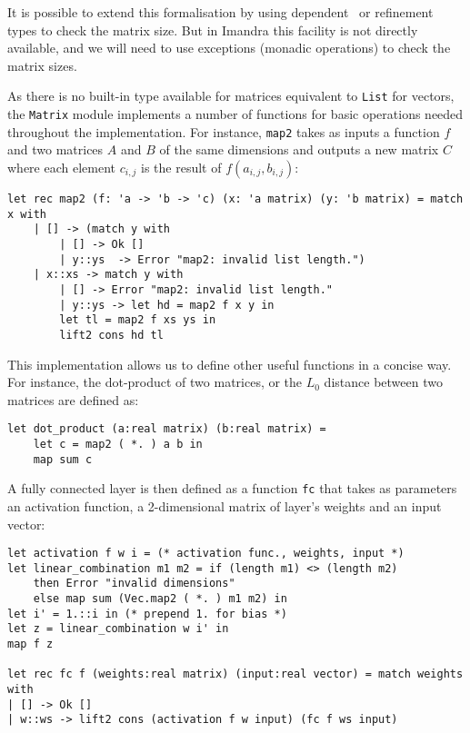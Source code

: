 \documentclass[runningheads]{llncs}
\begin{document}
It is possible to extend this formalisation by using dependent~\cite{heras_incidence_2011} or refinement~\cite{KokkeKKAA20} types to check the matrix size. But in Imandra this facility is not directly available, and we will need to use exceptions (monadic operations) to check the matrix sizes.

As there is no built-in type available for matrices equivalent to \lstinline{List} for vectors, the \lstinline{Matrix} module implements a number of functions for basic operations needed throughout the implementation. For instance, \lstinline{map2} takes as inputs a function $f$ and two matrices $A$ and $B$ of the same dimensions and outputs a new matrix $C$ where each element $c_{i,j}$ is the result of $f(a_{i, j}, b_{i, j})$:

\begin{lstlisting}[frame=none, language=caml]
let rec map2 (f: 'a -> 'b -> 'c) (x: 'a matrix) (y: 'b matrix) = match x with
	| [] -> (match y with
		| [] -> Ok []
		| y::ys  -> Error "map2: invalid list length.")
	| x::xs -> match y with 
		| [] -> Error "map2: invalid list length." 
		| y::ys -> let hd = map2 f x y in
		let tl = map2 f xs ys in
		lift2 cons hd tl
\end{lstlisting}

This implementation allows us to define other useful functions in a concise way. For instance, the dot-product of two matrices, or the $L_0$ distance between two matrices are defined as:

\begin{lstlisting}[frame=none, language=caml]
let dot_product (a:real matrix) (b:real matrix) =
	let c = map2 ( *. ) a b in
	map sum c
\end{lstlisting}




A fully connected layer is then defined as a function \lstinline{fc} that takes
as parameters an activation function, a 2-dimensional matrix of
layer's weights and an input vector:
\begin{lstlisting}[caption=Fully connected layer implementation, language=caml, label={lst:fully_connected}]
let activation f w i = (* activation func., weights, input *)
let linear_combination m1 m2 = if (length m1) <> (length m2)
    then Error "invalid dimensions" 
    else map sum (Vec.map2 ( *. ) m1 m2) in
let i' = 1.::i in (* prepend 1. for bias *)
let z = linear_combination w i' in
map f z
	
let rec fc f (weights:real matrix) (input:real vector) = match weights with
| [] -> Ok []
| w::ws -> lift2 cons (activation f w input) (fc f ws input)
	
\end{lstlisting} 
\end{document}
